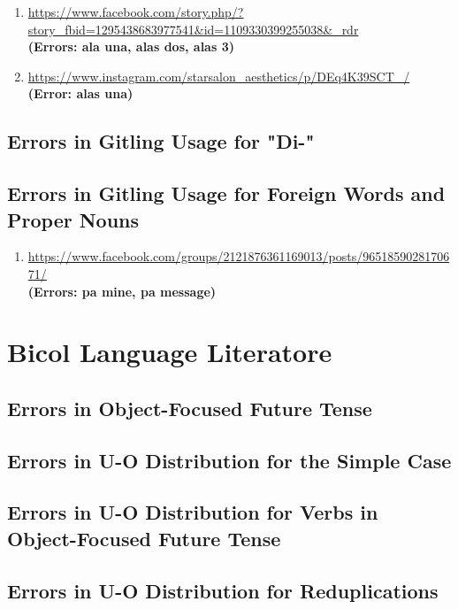 \begin{enumerate}
    \item \url{https://www.facebook.com/story.php/?story_fbid=1295438683977541&id=1109330399255038&_rdr} \\
    \textbf{(Errors: ala una, alas dos, alas 3)}
    \item \url{https://www.instagram.com/starsalon_aesthetics/p/DEq4K39SCT_/} \\
    \textbf{(Error: alas una)}
\end{enumerate}

\subsection{Errors in Gitling Usage for "Di-"}
\subsection{Errors in Gitling Usage for Foreign Words and Proper Nouns}

\begin{enumerate}
    \item \url{https://www.facebook.com/groups/2121876361169013/posts/9651859028170671/} \\
    \textbf{(Errors: pa mine, pa message)}
\end{enumerate}


\section{Bicol Language Literatore}
\subsection{Errors in Object-Focused Future Tense}
\subsection{Errors in U-O Distribution for the Simple Case}
\subsection{Errors in U-O Distribution for Verbs in Object-Focused Future Tense}
\subsection{Errors in U-O Distribution for Reduplications}